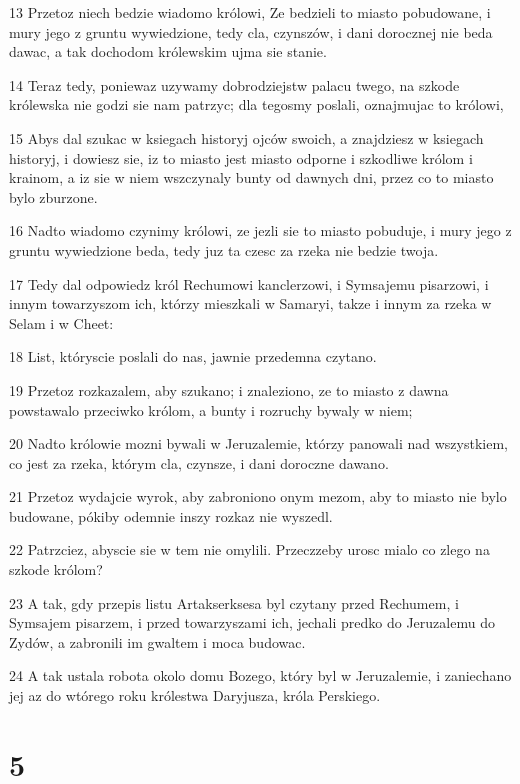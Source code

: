 \par 13 Przetoz niech bedzie wiadomo królowi, Ze bedzieli to miasto pobudowane, i mury jego z gruntu wywiedzione, tedy cla, czynszów, i dani dorocznej nie beda dawac, a tak dochodom królewskim ujma sie stanie.
\par 14 Teraz tedy, poniewaz uzywamy dobrodziejstw palacu twego, na szkode królewska nie godzi sie nam patrzyc; dla tegosmy poslali, oznajmujac to królowi,
\par 15 Abys dal szukac w ksiegach historyj ojców swoich, a znajdziesz w ksiegach historyj, i dowiesz sie, iz to miasto jest miasto odporne i szkodliwe królom i krainom, a iz sie w niem wszczynaly bunty od dawnych dni, przez co to miasto bylo zburzone.
\par 16 Nadto wiadomo czynimy królowi, ze jezli sie to miasto pobuduje, i mury jego z gruntu wywiedzione beda, tedy juz ta czesc za rzeka nie bedzie twoja.
\par 17 Tedy dal odpowiedz król Rechumowi kanclerzowi, i Symsajemu pisarzowi, i innym towarzyszom ich, którzy mieszkali w Samaryi, takze i innym za rzeka w Selam i w Cheet:
\par 18 List, któryscie poslali do nas, jawnie przedemna czytano.
\par 19 Przetoz rozkazalem, aby szukano; i znaleziono, ze to miasto z dawna powstawalo przeciwko królom, a bunty i rozruchy bywaly w niem;
\par 20 Nadto królowie mozni bywali w Jeruzalemie, którzy panowali nad wszystkiem, co jest za rzeka, którym cla, czynsze, i dani doroczne dawano.
\par 21 Przetoz wydajcie wyrok, aby zabroniono onym mezom, aby to miasto nie bylo budowane, pókiby odemnie inszy rozkaz nie wyszedl.
\par 22 Patrzciez, abyscie sie w tem nie omylili. Przeczzeby urosc mialo co zlego na szkode królom?
\par 23 A tak, gdy przepis listu Artakserksesa byl czytany przed Rechumem, i Symsajem pisarzem, i przed towarzyszami ich, jechali predko do Jeruzalemu do Zydów, a zabronili im gwaltem i moca budowac.
\par 24 A tak ustala robota okolo domu Bozego, który byl w Jeruzalemie, i zaniechano jej az do wtórego roku królestwa Daryjusza, króla Perskiego.

\chapter{5}

